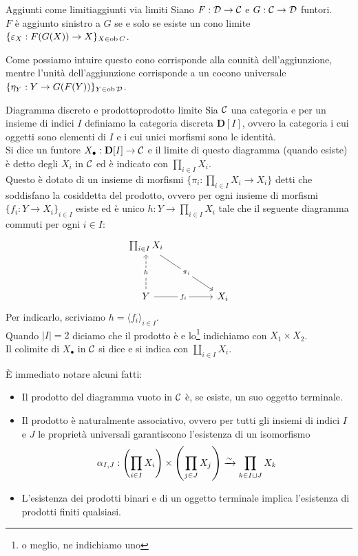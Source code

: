 \documentclass[openany]{book}
\renewcommand\C{\mc{C}}
\newcommand\D{\mc{D}}
\begin{document}
\begin{proposition}{Aggiunti come limiti}{aggiunti via limiti}
    Siano $F:\D\to\C$ e $G:\C\to\D$ funtori.\\
    $F$ è aggiunto sinistro a $G$ se e solo se esiste un cono limite $\{ \varepsilon_X : F(G(X))\to X \}_{X\in \operatorname{ob} C}$. 
\end{proposition}

Come possiamo intuire questo cono corrisponde alla counità dell'aggiunzione, mentre l'unità dell'aggiunzione corrisponde a un cocono universale $\{ \eta_Y : Y \to G(F(Y)) \}_{Y \in \ob \D}$.

\begin{definition}{Diagramma discreto e prodotto}{prodotto limite}
    Sia $\C$ una categoria e per un insieme di indici $I$ definiamo la categoria discreta $\mathbf{D}[I]$, ovvero la categoria i cui oggetti sono elementi di $I$ e i cui unici morfismi sono le identità.\\
    Si dice  un funtore $X_{\bullet}:\mathbf{D}[I]\to\C$ e il limite di questo diagramma (quando esiste) è detto  degli $X_i$ in $\C$ ed è indicato con $\prod_{i \in I}X_i$.\\
    Questo è dotato di un insieme di morfismi $\{\pi_i:\prod_{i \in I}X_i\to X_i\}$ detti  che soddisfano la cosiddetta  del prodotto, ovvero per ogni insieme di morfismi $\{ f_i :Y\to X_i \}_{i\in I}$ esiste ed è unico $h:Y\to \prod_{i \in I}X_i$ tale che il seguente diagramma commuti per ogni $i \in I$:
    \[\begin{tikzcd}
    	{\prod_{i \in I}X_i} && \\
	    \\
	    Y && {X_i}
	    \arrow["{\pi_i}"{description}, from=1-1, to=3-3]
	    \arrow["h"{description}, dashed, from=3-1, to=1-1]
	    \arrow["{f_i}"{description}, from=3-1, to=3-3]
    \end{tikzcd}\]
    Per indicarlo, scriviamo $h = \langle f_i \rangle_{i \in I}$.\\
    Quando $|I| = 2$ diciamo che il prodotto è  e lo\footnote{o meglio, ne indichiamo uno} indichiamo con $X_1\times X_2$.\\
    Il colimite di $X_\bullet$ in $\C$ si dice  e si indica con $\amalg_{i \in I}X_i$.
\end{definition}

È immediato notare alcuni fatti:\begin{itemize}
    \item Il prodotto del diagramma vuoto in $\C$ è, se esiste, un suo oggetto terminale.
    \item Il prodotto è naturalmente associativo, ovvero per tutti gli insiemi di indici $I$ e $J$ le proprietà universali garantiscono l'esistenza di un isomorfismo 
    \[ \alpha_{I,J}: \left( \prod_{i\in I} X_i \right)\times \left(\prod_{j\in J} X_j\right)\xrightarrow{\sim} \prod_{k \in I\sqcup J} X_k \]
    \item L'esistenza dei prodotti binari e di un oggetto terminale implica l'esistenza di prodotti finiti qualsiasi.
\end{itemize}
\end{document}
